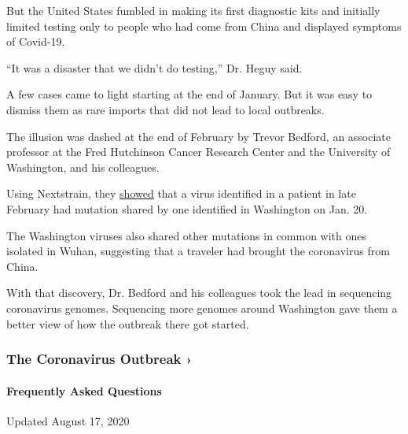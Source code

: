 But the United States fumbled in making its first diagnostic kits and
initially limited testing only to people who had come from China and
displayed symptoms of Covid-19.

``It was a disaster that we didn't do testing,'' Dr. Heguy said.

A few cases came to light starting at the end of January. But it was
easy to dismiss them as rare imports that did not lead to local
outbreaks.

The illusion was dashed at the end of February by Trevor Bedford, an
associate professor at the Fred Hutchinson Cancer Research Center and
the University of Washington, and his colleagues.

Using Nextstrain, they
\href{https://www.nytimes3xbfgragh.onion/2020/03/01/health/coronavirus-washington-spread.html}{showed}
that a virus identified in a patient in late February had mutation
shared by one identified in Washington on Jan. 20.

The Washington viruses also shared other mutations in common with ones
isolated in Wuhan, suggesting that a traveler had brought the
coronavirus from China.

With that discovery, Dr. Bedford and his colleagues took the lead in
sequencing coronavirus genomes. Sequencing more genomes around
Washington gave them a better view of how the outbreak there got
started.

\href{https://www.nytimes3xbfgragh.onion/news-event/coronavirus?action=click\&pgtype=Article\&state=default\&region=MAIN_CONTENT_3\&context=storylines_faq}{}

\hypertarget{the-coronavirus-outbreak-}{%
\subsubsection{The Coronavirus Outbreak
›}\label{the-coronavirus-outbreak-}}

\hypertarget{frequently-asked-questions}{%
\paragraph{Frequently Asked
Questions}\label{frequently-asked-questions}}

Updated August 17, 2020

